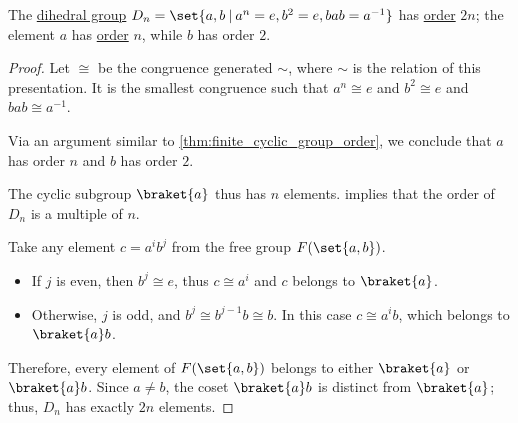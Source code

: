\begin{proposition}\label{thm:dihedral_group_order}
  The \hyperref[def:dihedral_group]{dihedral group} \( D_n = \set{ a, b \given a^n = e, b^2 = e, bab = a^{-1} } \) has \hyperref[def:group_order]{order} \( 2n \); the element \( a \) has \hyperref[def:group_element_order]{order} \( n \), while \( b \) has order \( 2 \).
\end{proposition}
\begin{proof}
  Let \( {\cong} \) be the congruence generated \( {\sim} \), where \( {\sim} \) is the relation of this presentation. It is the smallest congruence such that \( a^n \cong e \) and \( b^2 \cong e \) and \( bab \cong a^{-1} \).

  Via an argument similar to \cref{thm:finite_cyclic_group_order}, we conclude that \( a \) has order \( n \) and \( b \) has order \( 2 \).

  The cyclic subgroup \( \braket{ a } \) thus has \( n \) elements.  implies that the order of \( D_n \) is a multiple of \( n \).

  Take any element \( c = a^i b^j \) from the free group \( F(\set{ a, b }) \).
  \begin{itemize}
    \item If \( j \) is even, then \( b^j \cong e \), thus \( c \cong a^i \) and \( c \) belongs to \( \braket{ a } \).
    \item Otherwise, \( j \) is odd, and \( b^j \cong b^{j-1} b \cong b \). In this case \( c \cong a^i b \), which belongs to \( \braket{ a } b \).
  \end{itemize}

  Therefore, every element of \( F(\set{ a, b }) \) belongs to either \( \braket{ a } \) or \( \braket{ a } b \). Since \( a \neq b \), the coset \( \braket{ a } b \) is distinct from \( \braket{ a } \); thus, \( D_n \) has exactly \( 2n \) elements.
\end{proof}

